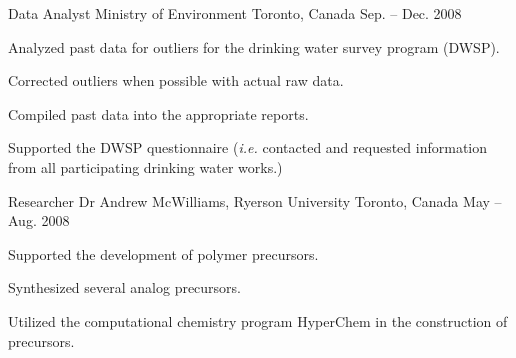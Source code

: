 \begin{cventries}
  \cventry
    {Data Analyst}
    {Ministry of Environment}
    {Toronto, Canada}
    {Sep. -- Dec. 2008}
    {
      \begin{cvitems}
        \item {Analyzed past data for outliers for the drinking water survey program (DWSP).}
        \item {Corrected outliers when possible with actual raw data.}
        \item {Compiled past data into the appropriate reports.}
        \item {Supported the DWSP questionnaire (\textit{i.e.} contacted and requested information from all participating drinking water works.)}
      \end{cvitems}
    }

  \cventry
    {Researcher}
    {Dr Andrew McWilliams, Ryerson University}
    {Toronto, Canada}
    {May -- Aug. 2008}
    {
      \begin{cvitems}
        \item {Supported the development of polymer precursors.}
        \item {Synthesized several analog precursors.}
        \item {Utilized the computational chemistry program HyperChem in the construction of precursors.}
      \end{cvitems}
    }

\end{cventries}

